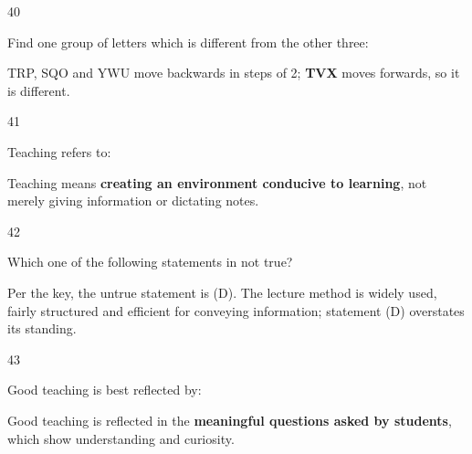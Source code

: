 \begin{question}{40}
{Find one group of letters which is different from the other three:\par}
\begin{explain}
TRP, SQO and YWU move backwards in steps of 2; \textbf{TVX} moves forwards, so it is different.
\end{explain}
\end{question}

\begin{question}{41}
{Teaching refers to:\par}
\begin{explain}
Teaching means \textbf{creating an environment conducive to learning}, not merely giving information or dictating notes.
\end{explain}
\end{question}

\begin{question}{42}
{Which one of the following statements in not true?\par}
\begin{explain}
Per the key, the untrue statement is (D). The lecture method is widely used, fairly structured and efficient for conveying information; statement (D) overstates its standing.
\end{explain}
\end{question}

\begin{question}{43}
{Good teaching is best reflected by:\par}
\begin{explain}
Good teaching is reflected in the \textbf{meaningful questions asked by students}, which show understanding and curiosity.
\end{explain}
\end{question}

